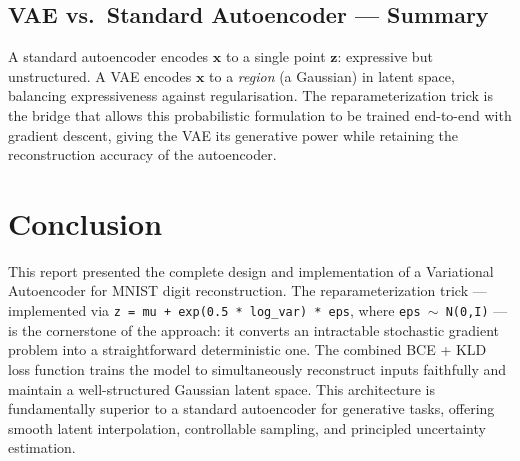 \documentclass[12pt,a4paper]{article}
\begin{document}
\subsection{VAE vs.\ Standard Autoencoder — Summary}

A standard autoencoder encodes $\mathbf{x}$ to a single point $\mathbf{z}$: expressive but unstructured. A VAE encodes $\mathbf{x}$ to a \emph{region} (a Gaussian) in latent space, balancing expressiveness against regularisation. The reparameterization trick is the bridge that allows this probabilistic formulation to be trained end-to-end with gradient descent, giving the VAE its generative power while retaining the reconstruction accuracy of the autoencoder.

\section{Conclusion}

This report presented the complete design and implementation of a Variational Autoencoder for MNIST digit reconstruction. The reparameterization trick — implemented via \texttt{z = mu + exp(0.5 * log\_var) * eps}, where \texttt{eps $\sim$ N(0,I)} — is the cornerstone of the approach: it converts an intractable stochastic gradient problem into a straightforward deterministic one. The combined BCE + KLD loss function trains the model to simultaneously reconstruct inputs faithfully and maintain a well-structured Gaussian latent space. This architecture is fundamentally superior to a standard autoencoder for generative tasks, offering smooth latent interpolation, controllable sampling, and principled uncertainty estimation.
\end{document}
